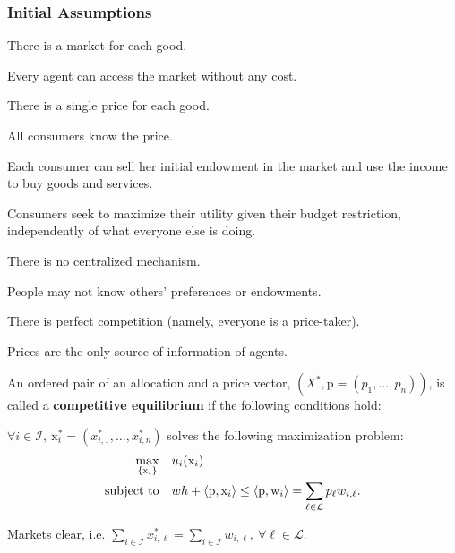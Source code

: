 \documentclass[8pt,a4paper]{extarticle}
\begin{document}
\begin{multicols}{3}
  \subsubsection*{Initial Assumptions}

  \begin{bulletlist}
    \item There is a market for each good.
    \item Every agent can access the market without any cost.
    \item There is a single price for each good.
    \item All consumers know the price.
    \item Each consumer can sell her initial endowment in the market and use the income to buy goods and services.
    \item Consumers seek to maximize their utility given their budget restriction, independently of what everyone else is doing.
    \item There is no centralized mechanism.
    \item People may not know others' preferences or endowments.
    \item There is perfect competition (namely, everyone is a price-taker).
    \item Prices are the only source of information of agents.
  \end{bulletlist}

  \begin{boxdef}
    An ordered pair of an allocation and a price vector, $(X^*, \mathrm{p} = (p_1, \ldots, p_n))$, is called a \textbf{competitive equilibrium} if the following conditions hold:
    \begin{eqlist}
      \item $\forall i \in \mathcal{I},\ \mathrm{x}^*_i = (x^*_{i, 1}, \ldots, x^*_{i, n})$ solves the following maximization problem:
      \begin{equation*}
        \begin{aligned}
          \max_{\{\mathrm{x}_i\}}\quad        & u_i(\mathrm{x}_i)                                                                             \\
          \text{\normalfont subject to} \quad & wh + \left\langle \mathrm{p},\mathrm{x}_i \right\rangle \le \left\langle\mathrm{p},\mathrm{w}_i\right\rangle = \sum_{\ell \in \mathcal{L}} p_\ell w_{i, \ell}.
        \end{aligned}
      \end{equation*}
      \item Markets clear, i.e. $\displaystyle \sum_{i \in \mathcal{I}} x^*_{i, \ell} = \sum_{i \in \mathcal{I}} w_{i, \ell},\ \forall \ell \in \mathcal{L}$.
    \end{eqlist}
  \end{boxdef}


\end{multicols}
\end{document}
